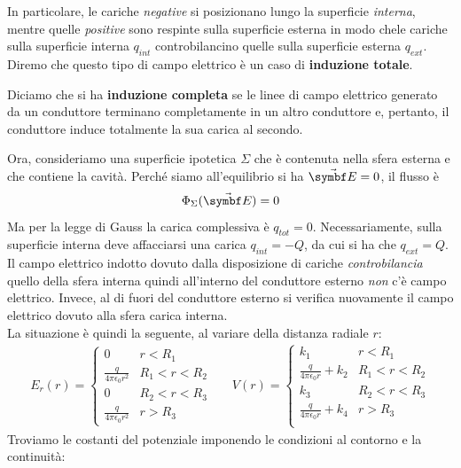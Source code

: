 In particolare, le cariche \textit{negative} si posizionano lungo la superficie \textit{interna}, mentre quelle \textit{positive} sono respinte sulla superficie esterna in modo chele cariche sulla superficie interna $q_{int}$ controbilancino quelle sulla superficie esterna $q_{ext}$. Diremo che questo tipo di campo elettrico è un caso di \textbf{induzione totale}.
\begin{define}
	Diciamo che si ha \textbf{induzione completa} se le linee di campo elettrico generato da un conduttore terminano completamente in un altro conduttore e, pertanto, il conduttore induce totalmente la sua carica al secondo. 
\end{define}
Ora, consideriamo una superficie ipotetica $\Sigma$ che è contenuta nella sfera esterna e che contiene la cavità. Perché siamo all'equilibrio si ha $\vba{E}=0$, il flusso è
\begin{equation*}
	\Phi_{\Sigma}(\vba{E})=0
\end{equation*}
Ma per la legge di Gauss la carica complessiva è $q_{tot}=0$. Necessariamente, sulla superficie interna deve affacciarsi una carica $q_{int}=-Q$, da cui si ha che $q_{ext}=Q$. Il campo elettrico indotto dovuto dalla disposizione di cariche \textit{controbilancia} quello della sfera interna quindi all'interno del conduttore esterno \textit{non} c'è campo elettrico. Invece, al di fuori del conduttore esterno si verifica nuovamente il campo elettrico dovuto alla sfera carica interna.\\
La situazione è quindi la seguente, al variare della distanza radiale $r$:
\begin{align*}
	E_{r}(r)=\begin{cases}
		0 & r<R_1\\
		\frac{q}{4\pi\epsilon_0r^2} & R_1<r<R_2\\
		0 & R_2<r<R_3\\
		\frac{q}{4\pi\epsilon_0 r^2} & r>R_3
	\end{cases}
	&&
	V(r)=\begin{cases}
		k_1 & r<R_1\\
		\frac{q}{4\pi\epsilon_0r}+k_2 & R_1<r<R_2\\
		k_3 & R_2<r<R_3\\
		\frac{q}{4\pi\epsilon_0r}+k_4 & r>R_3\\
	\end{cases}
\end{align*}
Troviamo le costanti del potenziale imponendo le condizioni al contorno e la continuità:
